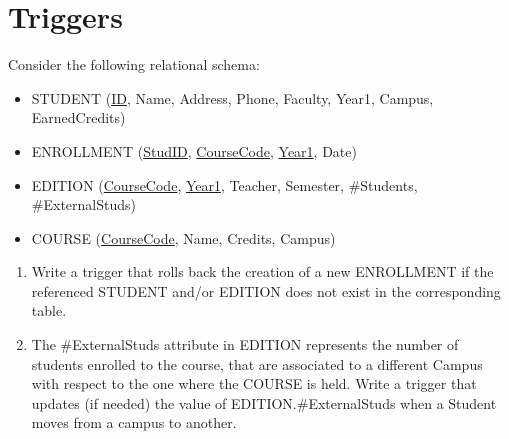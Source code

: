 \section{Triggers}

Consider the following relational schema:
\begin{itemize}
    \item STUDENT (\underline{ID}, Name, Address, Phone, Faculty, Year1, Campus, EarnedCredits)
    \item ENROLLMENT (\underline{StudID}, \underline{CourseCode}, \underline{Year1}, Date)
    \item EDITION (\underline{CourseCode}, \underline{Year1}, Teacher, Semester, \#Students, \#ExternalStuds)
    \item COURSE (\underline{CourseCode}, Name, Credits, Campus)
\end{itemize}
\begin{enumerate}
    \item Write a trigger that rolls back the creation of a new ENROLLMENT if the referenced STUDENT and/or EDITION does not exist in the corresponding table. 
    \item The \#ExternalStuds attribute in EDITION represents the number of students enrolled to the course, that are associated to a different Campus with respect to the one where the COURSE is held.
        Write a trigger that updates (if needed) the value of EDITION.\#ExternalStuds when a Student moves from a campus to another.
\end{enumerate}

